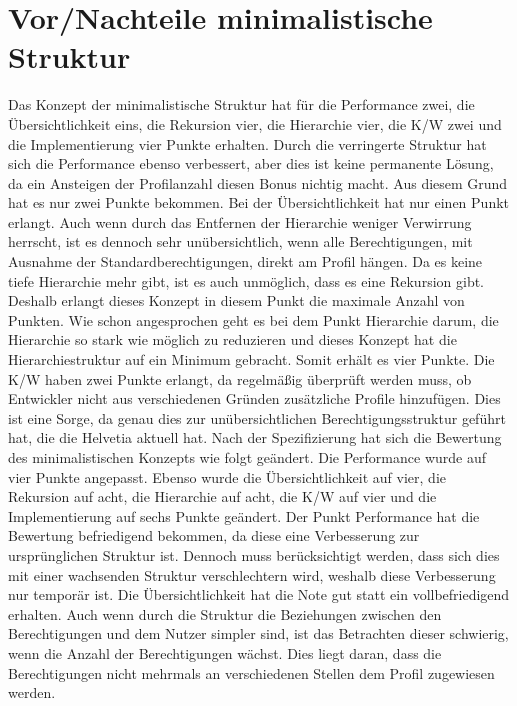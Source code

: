 \section{Vor/Nachteile minimalistische Struktur}
\label{sec:chapter05:Minimalistisch}
Das Konzept der minimalistische Struktur hat für die Performance zwei, die Übersichtlichkeit eins, die Rekursion vier, die Hierarchie vier, die \ac{K/W} zwei und die Implementierung vier Punkte erhalten.
Durch die verringerte Struktur hat sich die Performance ebenso verbessert, aber dies ist keine permanente Lösung, da ein Ansteigen der Profilanzahl diesen Bonus nichtig macht.
Aus diesem Grund hat es nur zwei Punkte bekommen.
Bei der Übersichtlichkeit hat nur einen Punkt erlangt.
Auch wenn durch das Entfernen der Hierarchie weniger Verwirrung herrscht, ist es dennoch sehr unübersichtlich, wenn alle Berechtigungen, mit Ausnahme der Standardberechtigungen, direkt am Profil hängen.
Da es keine tiefe Hierarchie mehr gibt, ist es auch unmöglich, dass es eine Rekursion gibt.
Deshalb erlangt dieses Konzept in diesem Punkt die maximale Anzahl von Punkten.
Wie schon angesprochen geht es bei dem Punkt Hierarchie darum, die Hierarchie so stark wie möglich zu reduzieren und dieses Konzept hat die Hierarchiestruktur auf ein Minimum gebracht. Somit erhält es vier Punkte.
Die \ac{K/W} haben zwei Punkte erlangt, da regelmäßig überprüft werden muss, ob Entwickler nicht aus verschiedenen Gründen zusätzliche Profile hinzufügen.
Dies ist eine Sorge, da genau dies zur unübersichtlichen Berechtigungsstruktur geführt hat, die die Helvetia aktuell hat.
\newline
\newline
Nach der Spezifizierung hat sich die Bewertung des minimalistischen Konzepts wie folgt geändert.
Die Performance wurde auf vier Punkte angepasst. Ebenso wurde die Übersichtlichkeit auf vier, die Rekursion auf acht, die Hierarchie auf acht, die \ac{K/W} auf vier und die Implementierung auf sechs Punkte geändert.
Der Punkt Performance hat die Bewertung befriedigend bekommen, da diese eine Verbesserung zur ursprünglichen Struktur ist.
Dennoch muss berücksichtigt werden, dass sich dies mit einer wachsenden Struktur verschlechtern wird, weshalb diese Verbesserung nur temporär ist.
Die Übersichtlichkeit hat die Note gut statt ein vollbefriedigend erhalten.
Auch wenn durch die Struktur die Beziehungen zwischen den Berechtigungen und dem Nutzer simpler sind, ist das Betrachten dieser schwierig, wenn die Anzahl der Berechtigungen wächst.
Dies liegt daran, dass die Berechtigungen nicht mehrmals an verschiedenen Stellen dem Profil zugewiesen werden.
